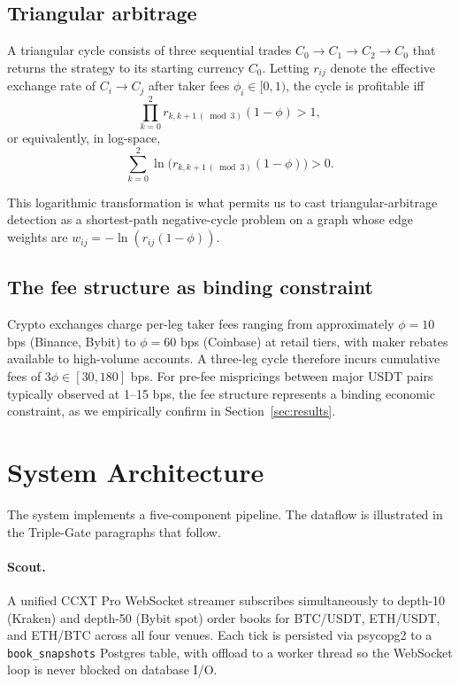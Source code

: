 \documentclass[11pt,a4paper]{article}
\begin{document}
\subsection{Triangular arbitrage}
A triangular cycle consists of three sequential trades $C_0 \to C_1 \to C_2 \to C_0$ that returns the strategy to its starting currency $C_0$. Letting $r_{ij}$ denote the effective exchange rate of $C_i \to C_j$ after taker fees $\phi_i \in [0,1)$, the cycle is profitable iff
\begin{equation}
\prod_{k=0}^{2} r_{k,k+1\,(\!\!\bmod 3)} (1 - \phi) > 1,
\end{equation}
or equivalently, in log-space,
\begin{equation}
\sum_{k=0}^{2} \ln\!\Big( r_{k,k+1\,(\!\!\bmod 3)} (1 - \phi) \Big) > 0.
\end{equation}

This logarithmic transformation is what permits us to cast triangular-arbitrage detection as a shortest-path negative-cycle problem on a graph whose edge weights are $w_{ij} = -\ln(r_{ij}(1-\phi))$.

\subsection{The fee structure as binding constraint}
Crypto exchanges charge per-leg taker fees ranging from approximately $\phi = 10$ bps (Binance, Bybit) to $\phi = 60$ bps (Coinbase) at retail tiers, with maker rebates available to high-volume accounts. A three-leg cycle therefore incurs cumulative fees of $3\phi \in [30, 180]$ bps. For pre-fee mispricings between major USDT pairs typically observed at 1--15 bps, the fee structure represents a binding economic constraint, as we empirically confirm in Section~\ref{sec:results}.

\section{System Architecture}
\label{sec:architecture}

The system implements a five-component pipeline. The dataflow is illustrated in the Triple-Gate paragraphs that follow.

\paragraph{Scout.} A unified CCXT Pro WebSocket streamer subscribes simultaneously to depth-10 (Kraken) and depth-50 (Bybit spot) order books for BTC/USDT, ETH/USDT, and ETH/BTC across all four venues. Each tick is persisted via psycopg2 to a \texttt{book\_snapshots} Postgres table, with offload to a worker thread so the WebSocket loop is never blocked on database I/O.
\end{document}
